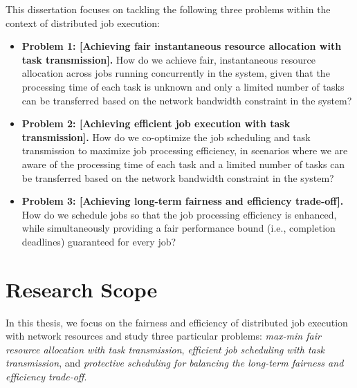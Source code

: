 This dissertation focuses on tackling the following three problems within the context of distributed job execution:
\begin{itemize}[nosep, leftmargin=*]
    \item \textbf{Problem 1: [Achieving fair instantaneous resource allocation with task transmission].} 
    How do we achieve fair, instantaneous resource allocation across jobs running concurrently in the system, given that the processing time of each task is unknown and only a limited number of tasks can be transferred based on the network bandwidth constraint in the system?
    
    \item \textbf{Problem 2: [Achieving efficient job execution with task transmission].} 
    How do we co-optimize the job scheduling and task transmission to maximize job processing efficiency, in scenarios where we are aware of the processing time of each task and a limited number of tasks can be transferred based on the network bandwidth constraint in the system?
    
    \item \textbf{Problem 3: [Achieving long-term fairness and efficiency trade-off].} 
    How do we schedule jobs so that the job processing efficiency is enhanced, while simultaneously providing a fair performance bound (i.e., completion deadlines) guaranteed for every job?
\end{itemize}



\section{Research Scope}
\label{sec:scope}
In this thesis, we focus on the fairness and efficiency of distributed job execution with network resources and study three particular problems: \textit{max-min fair resource allocation with task transmission}, \textit{efficient job scheduling with task transmission}, and \textit{protective scheduling for balancing the long-term fairness and efficiency trade-off}.

